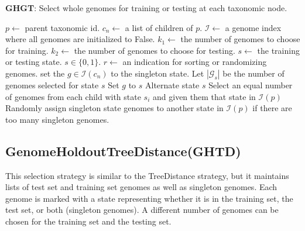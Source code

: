 \documentclass[12pt, letterpaper]{article}
\begin{document}
\begin{algorithm}[h!]
\caption{\textbf{GHGT}: Select whole genomes for training or testing at each taxonomic node.}
\label{GHGT}
\begin{algorithmic}
\State $p \gets$ parent taxonomic id.
\State $c_n \gets$ a list of children of $p$.
\State $\mathcal{I} \gets$ a genome index where all genomes are initialized to False.
\State $k_1 \gets$ the number of genomes to choose for training.
\State $k_2 \gets$ the number of genomes to choose for testing.
\State $s \gets$ the training or testing state.  $s \in \{0, 1\}$.
\State $r \gets$ an indication for sorting or randomizing genomes.
 
set the $g \in \mathcal{I}(c_n)$ to the singleton state.
\Else
\State Let $|\mathcal{G}_s|$ be the number of genomes selected for state $s$
\State Set $g$ to $s$ 
\State Alternate state $s$
\EndIf
\EndFor
\EndIf
\Else {}
\State Select an equal number of genomes from each child with state $s_i$ and given them that state in $\mathcal{I}(p)$
\EndFor
\State Randomly assign singleton state genomes to another state in $\mathcal{I}(p)$ if there are too many singleton genomes.
\EndIf
\EndProcedure
\end{algorithmic}
\end{algorithm}

\newpage


\subsection{GenomeHoldoutTreeDistance(GHTD)}
This selection strategy is similar to the TreeDistance strategy, but it maintains lists of test set and training set genomes as well as singleton genomes.  Each genome is marked with a state representing whether it is in the training set, the test set, or both (singleton genomes).  A different number of genomes can be chosen for the training set and the testing set.
\end{document}
